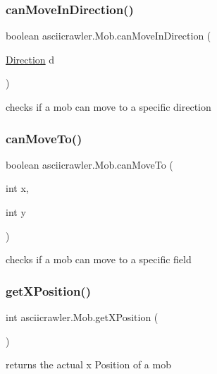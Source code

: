 \subsubsection{\texorpdfstring{can\+Move\+In\+Direction()}{canMoveInDirection()}}
{\footnotesize\ttfamily boolean asciicrawler.\+Mob.\+can\+Move\+In\+Direction (\begin{DoxyParamCaption}\item[{\hyperlink{enumasciicrawler_1_1Direction}{Direction}}]{d }\end{DoxyParamCaption})\hspace{0.3cm}{\ttfamily [inline]}}

checks if a mob can move to a specific direction \mbox{\label{classasciicrawler_1_1Mob_a494c5ae18f448b3dd98e7147d6e4c3db}} 
\subsubsection{\texorpdfstring{can\+Move\+To()}{canMoveTo()}}
{\footnotesize\ttfamily boolean asciicrawler.\+Mob.\+can\+Move\+To (\begin{DoxyParamCaption}\item[{int}]{x,  }\item[{int}]{y }\end{DoxyParamCaption})\hspace{0.3cm}{\ttfamily [inline]}}

checks if a mob can move to a specific field \mbox{\label{classasciicrawler_1_1Mob_a10163bd48f4b365f0921a8b65f563017}} 
\subsubsection{\texorpdfstring{get\+X\+Position()}{getXPosition()}}
{\footnotesize\ttfamily int asciicrawler.\+Mob.\+get\+X\+Position (\begin{DoxyParamCaption}{ }\end{DoxyParamCaption})\hspace{0.3cm}{\ttfamily [inline]}}

returns the actual x Position of a mob \mbox{\label{classasciicrawler_1_1Mob_a39572c2eb4a9dee3b92bd8094afffa9c}} 
